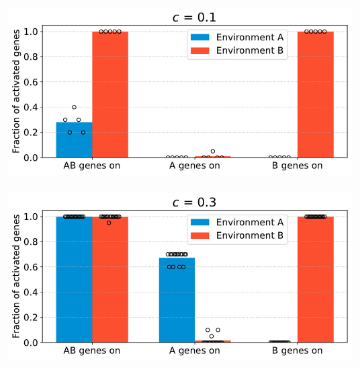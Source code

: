 \begin{figure}[H]
\centering
\begin{subfigure}[t]{0.49\textwidth}
\includegraphics[width=\textwidth]{alife/img/mean_activation_inter-coef-0.1.pdf}
\label{subfig:alife:param_c_1}
\end{subfigure}
\begin{subfigure}[t]{0.49\textwidth}
\includegraphics[width=\textwidth]{alife/img/mean_activation_inter_coef.pdf}
\label{subfig:alife:param_c_2}
\end{subfigure}


\end{figure}
